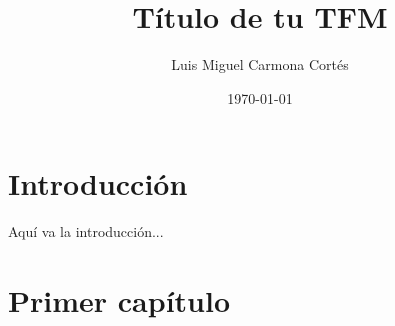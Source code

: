 \documentclass[12pt,a4paper]{report}
\title{Título de tu TFM}
\author{Luis Miguel Carmona Cortés}
\date{\today}
\begin{document}
\maketitle

\renewcommand{\contentsname}{Índice}  %
\tableofcontents

\chapter{Introducción}
Aquí va la introducción...


\chapter{Primer capítulo}


\printbibliography
\end{document}
